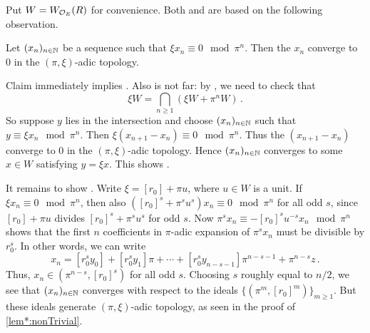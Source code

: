 \begin{proof*}
	Put $W=W_{\mathcal{O}_E}(R)$ for convenience. Both  and  are based on the following observation.
	\begin{alphanumerate}
		\item[\itememph{*}] Let $(x_n)_{n\in \mathbb{N}}$ be a sequence such that $\xi x_n\equiv 0\mod \pi^n$. Then the $x_n$ converge to $0$ in the $(\pi,\xi)$-adic topology.
	\end{alphanumerate}
	Claim \itememph{*} immediately implies . Also   is not far: by \cite[]{stacks-project}, we need to check that
	\begin{equation*}
		\xi W=\bigcap_{n\geq 1}(\xi W+\pi^nW)\,.
	\end{equation*}
	So suppose $y$ lies in the intersection and choose $(x_n)_{n\in \mathbb{N}}$ such that $y\equiv \xi x_n\mod \pi^n$. Then $\xi(x_{n+1}-x_n)\equiv 0\mod \pi^n$. Thus the $(x_{n+1}-x_n)$ converge to $0$ in the $(\pi,\xi)$-adic topology. Hence $(x_n)_{n\in \mathbb{N}}$ converges to some $x\in W$ satisfying $y=\xi x$. This shows .
	
	It remains to show \itememph{*}. Write $\xi=[r_0]+\pi u$, where $u\in W$ is a unit. If $\xi x_n\equiv 0\mod \pi^n$, then also $([r_0]^s+\pi^su^s)x_n\equiv 0\mod \pi^n$ for all odd $s$, since $[r_0]+\pi u$ divides $[r_0]^s+\pi^su^s$ for odd $s$. Now $\pi^sx_n\equiv -[r_0]^su^{-s}x_n\mod \pi^n$ shows that the first $n$ coefficients in $\pi$-adic expansion of $\pi^sx_n$ must be divisible by $r_0^s$. In other words, we can write
	\begin{equation*}
		x_n=[r_0^sy_0]+[r_0^sy_1]\pi+\dotsb+[r_0^sy_{n-s-1}]\pi^{n-s-1}+\pi^{n-s}z\,.
	\end{equation*}
	Thus, $x_n\in(\pi^{n-s},[r_0]^s)$ for all odd $s$. Choosing $s$ roughly equal to $n/2$, we see that $(x_n)_{n\in \mathbb{N}}$ converges with respect to the ideals $\{(\pi^m,[r_0]^m)\}_{m\geq 1}$. But these ideals generate $(\pi,\xi)$-adic topology, as seen in the proof of \cref{lem*:nonTrivial}. 
\end{proof*}



